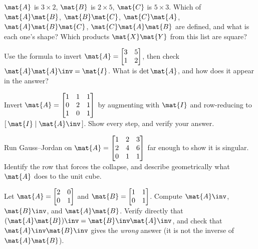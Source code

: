 \begin{exercise}[Shapes]
$\mat{A}$ is $3\times 2$, $\mat{B}$ is $2\times 5$, $\mat{C}$ is $5\times 3$. Which of
$\mat{A}\mat{B}$, $\mat{B}\mat{C}$, $\mat{C}\mat{A}$, $\mat{A}\mat{B}\mat{C}$,
$\mat{C}\mat{A}\mat{B}$ are defined, and what is each one's shape? Which products
$\mat{X}\mat{Y}$ from this list are square?
\end{exercise}

\begin{exercise}
Use the formula to invert $\mat{A} = \begin{bmatrix} 3 & 5 \\ 1 & 2 \end{bmatrix}$, then
check $\mat{A}\mat{A}\inv = \mat{I}$. What is $\det\mat{A}$, and how does it appear in the
answer?
\end{exercise}

\begin{exercise}
Invert $\mat{A} = \begin{bmatrix} 1 & 1 & 1 \\ 0 & 2 & 1 \\ 1 & 0 & 1 \end{bmatrix}$ by
augmenting with $\mat{I}$ and row-reducing to $[\,\mat{I}\mid\mat{A}\inv\,]$. Show every
step, and verify your answer.
\end{exercise}

\begin{exercise}
Run Gauss--Jordan on $\mat{A} = \begin{bmatrix} 1 & 2 & 3 \\ 2 & 4 & 6 \\ 0 & 1 & 1 \end{bmatrix}$ far enough to show it is singular. Identify the row that forces the
collapse, and describe geometrically what $\mat{A}$ does to the unit cube.
\end{exercise}

\begin{exercise}
Let $\mat{A} = \begin{bmatrix} 2 & 0 \\ 0 & 1 \end{bmatrix}$ and
$\mat{B} = \begin{bmatrix} 1 & 1 \\ 0 & 1 \end{bmatrix}$. Compute $\mat{A}\inv$,
$\mat{B}\inv$, and $\mat{A}\mat{B}$. Verify directly that $(\mat{A}\mat{B})\inv =
\mat{B}\inv\mat{A}\inv$, and check that $\mat{A}\inv\mat{B}\inv$ gives the \emph{wrong}
answer (it is not the inverse of $\mat{A}\mat{B}$).
\end{exercise}

